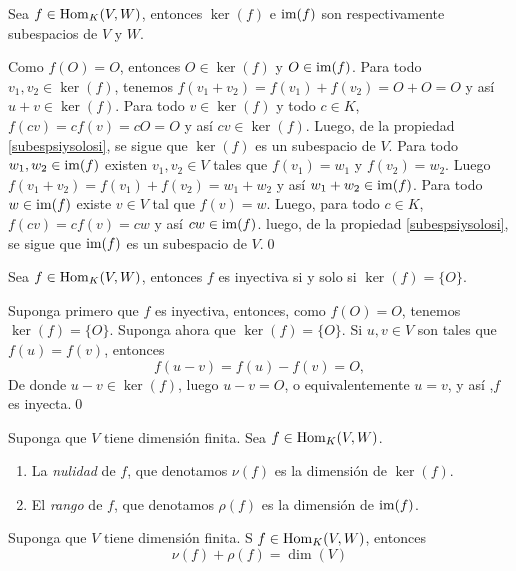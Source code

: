 \begin{pro}
Sea $f\in\operatorname{Hom}_K(V,W)$, entonces $\ker(f)$ e $\operatorname{im}(f)$ son respectivamente subespacios de $V$ y $W$.
\end{pro}

\dem Como $f(O)=O$, entonces $O\in\ker(f)$ y $O\in\operatorname{im}(f)$. Para todo $v_1,v_2\in \ker(f)$, tenemos $f(v_1+v_2)=f(v_1)+f(v_2)=O+O=O$ y  as\'i $u+v\in\ker(f)$. Para todo $v\in \ker(f)$ y todo $c\in K$, $f(cv)=cf(v)=cO=O$ y as\'i $cv\in\ker(f)$. Luego, de la propiedad \ref{subespsiysolosi}, se sigue que $\ker(f)$ es un subespacio de $V$. Para todo $w_1,w_2\in \operatorname{im}(f)$ existen $v_1,v_2\in V$ tales que $f(v_1)=w_1$ y $f(v_2)=w_2$. Luego $f(v_1+v_2)=f(v_1)+f(v_2)=w_1+w_2$ y as\'i $w_1+w_2\in\operatorname{im}(f)$. Para todo $w\in\operatorname{im}(f)$ existe $v\in V$ tal que $f(v)=w$. Luego, para todo $c\in K$, $f(cv)=cf(v)=cw$ y as\'i $cw\in\operatorname{im}(f)$. luego, de la propiedad \ref{subespsiysolosi}, se sigue que $\operatorname{im}(f)$ es un subespacio de $V$.\qed

\begin{prop}\label{inyectiva}
Sea $f\in\operatorname{Hom}_K(V,W)$, entonces $f$ es inyectiva si y solo si $\ker(f)=\{O\}$.
\end{prop}

\dem Suponga primero que $f$ es inyectiva, entonces, como $f(O)=O$, tenemos $\ker(f)=\{O\}$. Suponga ahora que $\ker(f)=\{O\}$. Si $u,v\in V$ son tales que $f(u)=f(v)$, entonces
\[
f(u-v)=f(u)-f(v)=O,
\]
De donde $u-v\in\ker(f)$, luego $u-v=O$, o equivalentemente $u=v$, y as\'i ,$f$ es inyecta.\qed

\begin{defn}
Suponga que $V$ tiene dimensi\'on finita. Sea $f\in\operatorname{Hom}_K(V,W)$.
\begin{enumerate}
\item La \emph{nulidad} de $f$, que denotamos $\nu(f)$ es la dimensi\'on de $\ker(f)$.
\item El \emph{rango} de $f$, que denotamos $\rho(f)$ es la dimensi\'on de $\operatorname{im}(f)$.
\end{enumerate}
\end{defn}

\begin{teo}\label{teorango}
Suponga que $V$ tiene dimensi\'on finita. S $f\in\operatorname{Hom}_K(V,W)$, entonces
\[
\nu(f)+\rho(f)=\dim (V)
\]
\end{teo}

